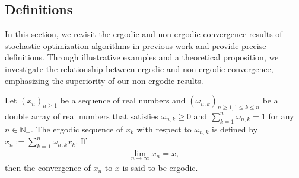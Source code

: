 \documentclass[twoside,11pt]{article}
\begin{document}
	
\subsection{Definitions}\label{dingyi}
In this section, we revisit the ergodic and non-ergodic convergence results of stochastic optimization algorithms in previous work and provide precise definitions. Through illustrative examples and a theoretical proposition, we investigate the relationship between ergodic and non-ergodic convergence, emphasizing the superiority of our non-ergodic results.

\begin{definition}\label{ergodic}
Let $(x_{n})_{n\geq 1}$ be a sequence of real numbers and $(\omega_{n,k})_{n\geq 1, 1\leq k\leq n}$ be a double array of real numbers that satisfies $\omega_{n,k}\geq 0$ and  $\sum_{k=1}^{n}\omega_{n,k}=1$ for any $n\in \mathbb{N}_{+}$. The ergodic sequence of $x_{k}$ with respect to $\omega_{n,k}$ is defined by $\bar{x}_{n}:=\sum_{k=1}^{n}\omega_{n,k}x_{k}$. If 
\begin{align*}
	\lim_{n\to\infty}
	\bar{x}_{n}=x,
\end{align*}
then the convergence of $x_{n}$ to $x$ is said to be ergodic. 
\end{definition}
\end{document}
